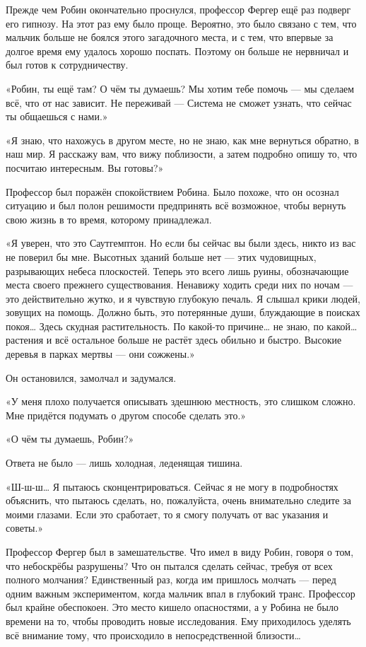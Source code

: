 \documentclass[a4paper,12pt]{book}
\begin{document}
\par
Прежде чем Робин окончательно проснулся, профессор Фергер ещё раз подверг его гипнозу. На этот раз ему было проще. Вероятно, это было связано с тем, что мальчик больше не боялся этого загадочного места, и с тем, что впервые за долгое время ему удалось хорошо поспать. Поэтому он больше не нервничал и был готов к сотрудничеству.
\par
«Робин, ты ещё там? О чём ты думаешь? Мы хотим тебе помочь — мы сделаем всё, что от нас зависит. Не переживай — Система не сможет узнать, что сейчас ты общаешься с нами.»
\par
«Я знаю, что нахожусь в другом месте, но не знаю, как мне вернуться обратно, в наш мир. Я расскажу вам, что вижу поблизости, а затем подробно опишу то, что посчитаю интересным. Вы готовы?»
\par
Профессор был поражён спокойствием Робина. Было похоже, что он осознал ситуацию и был полон решимости предпринять всё возможное, чтобы вернуть свою жизнь в то время, которому принадлежал.
\par
«Я уверен, что это Саутгемптон. Но если бы сейчас вы были здесь, никто из вас не поверил бы мне. Высотных зданий больше нет — этих чудовищных, разрывающих небеса плоскостей. Теперь это всего лишь руины, обозначающие места своего прежнего существования. Ненавижу ходить среди них по ночам — это действительно жутко, и я чувствую глубокую печаль. Я слышал крики людей, зовущих на помощь. Должно быть, это потерянные души, блуждающие в поисках покоя… Здесь скудная растительность. По какой-то причине…  не знаю, по какой… растения и всё остальное больше не растёт здесь обильно и быстро. Высокие деревья в парках мертвы — они сожжены.»
\par
Он остановился, замолчал и задумался.
\par
«У меня плохо получается описывать здешнюю местность, это слишком сложно. Мне придётся подумать о другом способе сделать это.»
\par
«О чём ты думаешь, Робин?»
\par
Ответа не было — лишь холодная, леденящая тишина.
\par
«Ш-ш-ш… Я пытаюсь сконцентрироваться. Сейчас я не могу в подробностях объяснить, что пытаюсь сделать, но, пожалуйста, очень внимательно следите за моими глазами. Если это сработает, то я смогу получать от вас указания и советы.»
\par
Профессор Фергер был в замешательстве. Что имел в виду Робин, говоря о том, что небоскрёбы разрушены? Что он пытался сделать сейчас, требуя от всех полного молчания?  Единственный раз, когда им пришлось молчать — перед одним важным экспериментом, когда мальчик впал в глубокий транс. Профессор был крайне обеспокоен. Это место кишело опасностями, а у Робина не было времени на то, чтобы проводить новые исследования. Ему приходилось уделять всё внимание тому, что происходило в непосредственной близости…\\
\end{document}
